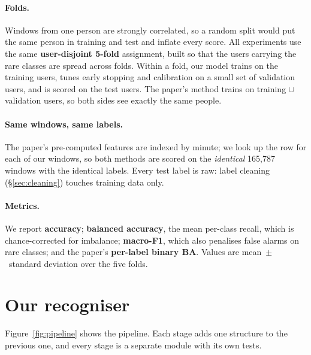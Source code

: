 \documentclass[11pt,a4paper]{article}
\begin{document}
\paragraph{Folds.}
Windows from one person are strongly correlated, so a random split would put the same
person in training and test and inflate every score. All experiments use the same
\textbf{user-disjoint 5-fold} assignment, built so that the users carrying the rare
classes are spread across folds. Within a fold, our model trains on the training users,
tunes early stopping and calibration on a small set of validation users, and is scored on
the test users. The paper's method trains on training $\cup$ validation users, so both
sides see exactly the same people.

\paragraph{Same windows, same labels.}
The paper's pre-computed features are indexed by minute; we look up the row for each of
our windows, so both methods are scored on the \emph{identical} 165{,}787 windows with
the identical labels. Every test label is raw: label cleaning (\S\ref{sec:cleaning})
touches training data only.

\paragraph{Metrics.}
We report \textbf{accuracy}; \textbf{balanced accuracy}, the mean per-class recall,
which is chance-corrected for imbalance; \textbf{macro-F1}, which also penalises false
alarms on rare classes; and the paper's \textbf{per-label binary BA}. Values are
mean~$\pm$~standard deviation over the five folds.

\section{Our recogniser}
\label{sec:method}

Figure~\ref{fig:pipeline} shows the pipeline. Each stage adds one structure to the
previous one, and every stage is a separate module with its own tests.
\end{document}
